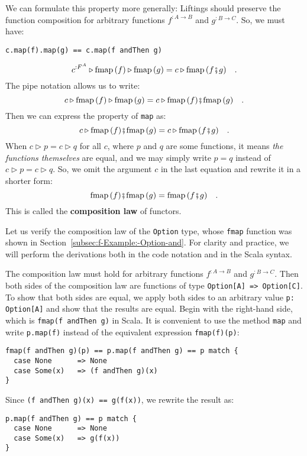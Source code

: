 We can formulate this property more generally: Liftings should preserve
the function composition for arbitrary functions $f^{:A\rightarrow B}$
and $g^{:B\rightarrow C}$. So, we must have:
\begin{lstlisting}
c.map(f).map(g) == c.map(f andThen g)
\end{lstlisting}
\[
c^{:F^{A}}\triangleright\text{fmap}\,(f)\triangleright\text{fmap}\,(g)=c\triangleright\text{fmap}\,(f\bef g)\quad.
\]
The pipe notation allows us to write:
\[
c\triangleright\text{fmap}\,(f)\triangleright\text{fmap}\,(g)=c\triangleright\text{fmap}\,(f)\bef\text{fmap}\,(g)\quad.
\]
Then we can express the property of \lstinline!map! as:
\[
c\triangleright\text{fmap}\,(f)\bef\text{fmap}\,(g)=c\triangleright\text{fmap}\,(f\bef g)\quad.
\]
When $c\triangleright p=c\triangleright q$ for all $c$, where $p$
and $q$ are some functions, it means \emph{the functions themselves}
are equal,  and we may simply write
$p=q$ instead of $c\triangleright p=c\triangleright q$. So, we omit
the argument $c$ in the last equation and rewrite it in a shorter
form:
\[
\text{fmap}\,(f)\bef\text{fmap}\,(g)=\text{fmap}\,(f\bef g)\quad.
\]
This is called the \textbf{composition law}
of functors. 

Let us verify the composition law of the \lstinline!Option! type,
whose \lstinline!fmap! function was shown in Section~\ref{subsec:f-Example:-Option-and}.
For clarity and practice, we will perform the derivations both in
the code notation and in the Scala syntax.

The composition law must hold for arbitrary functions $f^{:A\rightarrow B}$
and $g^{:B\rightarrow C}$. Then both sides of the composition law
are functions of type \lstinline!Option[A] => Option[C]!. To show
that both sides are equal, we apply both sides to an arbitrary value
\lstinline!p: Option[A]! and show that the results are equal. Begin
with the right-hand side, which is \lstinline!fmap(f andThen g)!
in Scala. It is convenient to use the  method \lstinline!map! and
write \lstinline!p.map(f)! instead of the equivalent expression \lstinline!fmap(f)(p)!:
\begin{lstlisting}
fmap(f andThen g)(p) == p.map(f andThen g) == p match {
  case None      => None
  case Some(x)   => (f andThen g)(x)
}
\end{lstlisting}
Since \lstinline!(f andThen g)(x) == g(f(x))!, we rewrite the result
as:
\begin{lstlisting}
p.map(f andThen g) == p match {
  case None      => None
  case Some(x)   => g(f(x))
}
\end{lstlisting}

